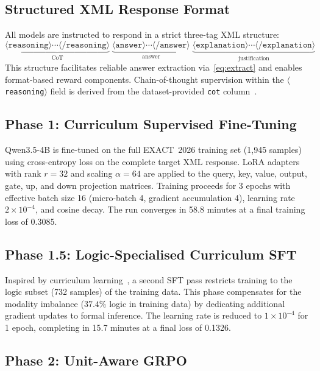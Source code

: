 \documentclass{ieeeaccess}
\newcommand{\basemodelname}{Qwen3.5-4B}
\newcommand{\dataset}{EXACT~2026}
\begin{document}
\subsection{Structured XML Response Format}

All models are instructed to respond in a strict three-tag XML structure:
\begin{equation}
  \underbrace{\langle\texttt{reasoning}\rangle\cdots\langle/\texttt{reasoning}\rangle}_{\text{CoT}}
  \;
  \underbrace{\langle\texttt{answer}\rangle\cdots\langle/\texttt{answer}\rangle}_{\text{answer}}
  \;
  \underbrace{\langle\texttt{explanation}\rangle\cdots\langle/\texttt{explanation}\rangle}_{\text{justification}}
  \label{eq:format}
\end{equation}
This structure facilitates reliable answer extraction via~\eqref{eq:extract}
and enables format-based reward components.
Chain-of-thought supervision within the $\langle$\texttt{reasoning}$\rangle$
field is derived from the dataset-provided \texttt{cot} column~\cite{b1}.

\subsection{Phase 1: Curriculum Supervised Fine-Tuning}

\basemodelname{} is fine-tuned on the full \dataset{} training set
(1,945 samples) using cross-entropy loss on the complete target XML
response.
LoRA adapters with rank $r=32$ and scaling $\alpha=64$ are applied to
the query, key, value, output, gate, up, and down projection matrices.
Training proceeds for 3 epochs with effective batch size 16
(micro-batch 4, gradient accumulation 4), learning rate
$2\times10^{-4}$, and cosine decay.
The run converges in 58.8 minutes at a final training loss of 0.3085.

\subsection{Phase 1.5: Logic-Specialised Curriculum SFT}

Inspired by curriculum learning~\cite{b22}, a second SFT pass restricts
training to the logic subset (732 samples) of the training data.
This phase compensates for the modality imbalance ($37.4\%$ logic in
training data) by dedicating additional gradient updates to formal
inference.
The learning rate is reduced to $1\times10^{-4}$ for 1 epoch, completing
in 15.7 minutes at a final loss of 0.1326.

\subsection{Phase 2: Unit-Aware GRPO}
\label{sec:grpo}
\end{document}
